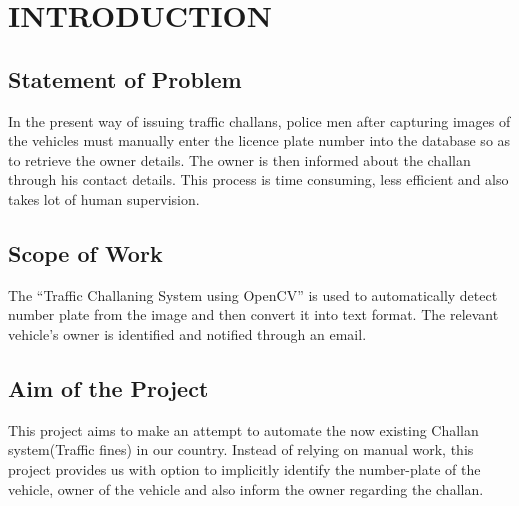 \documentclass[12pt,a4paper]{report}
\renewcommand{\baselinestretch}{1.35}
\begin{document}
\newpage
\renewcommand{\baselinestretch}{0.5}
\tableofcontents
{}
\clearpage

\newpage
\renewcommand{\baselinestretch}{1.25}
\chapter{INTRODUCTION}

\section{\textb  Statement of Problem}
In the present way of issuing traffic challans, police men after capturing images of the vehicles must manually enter the licence plate number into the database so as to retrieve the owner details.
The owner is then informed about the challan through his contact details.
This process is time consuming, less efficient and also takes lot of human supervision.\\
\section{\textb  Scope of Work }
The “Traffic Challaning System using OpenCV” is used to automatically detect number plate from the image and then convert it into text format. The relevant vehicle’s owner is identified and notified through an email.\\
\section{\textb  Aim of the Project}
This project aims to make an attempt to automate the now existing Challan system(Traffic fines) in our country. Instead of relying on manual work, this project provides us with option to implicitly identify the number-plate of the vehicle, owner of the vehicle and also inform the owner regarding the challan.\\
\end{document}
